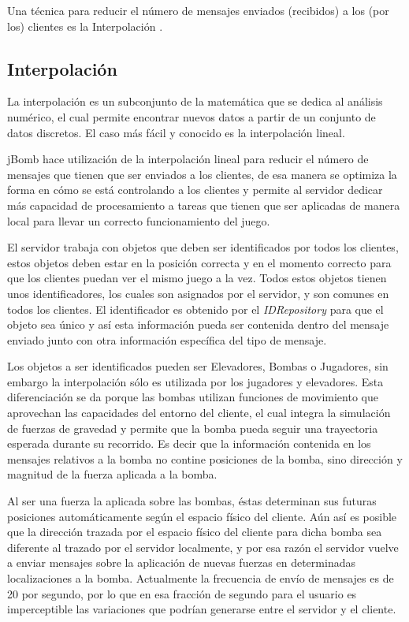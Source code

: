 \documentclass[a4paper,12pt,openany,oneside]{book}
\begin{document}
Una técnica para reducir el número de mensajes enviados (recibidos) a los (por los) clientes es la Interpolación \cite{VALVE1}.
\subsection{Interpolación} 
La interpolación es un subconjunto de la matemática que se dedica al análisis numérico, el cual permite encontrar nuevos datos a partir de un conjunto de datos discretos. El caso más fácil y conocido es la interpolación lineal.

jBomb hace utilización de la interpolación lineal para reducir el número de mensajes que tienen que ser enviados a los clientes, de esa manera se optimiza la forma en cómo se está controlando a los clientes y permite al servidor dedicar más capacidad de procesamiento a tareas que tienen que ser aplicadas de manera local para llevar un correcto funcionamiento del juego.

El servidor trabaja con objetos que deben ser identificados por todos los clientes, estos objetos deben estar en la posición correcta y en el momento correcto para que los clientes puedan ver el mismo juego a la vez. Todos estos objetos tienen unos identificadores, los cuales son asignados por el servidor, y son comunes en todos los clientes. El identificador es obtenido por el \textit{IDRepository} para que el objeto sea único y así esta información pueda ser contenida dentro del mensaje enviado junto con otra información específica del tipo de mensaje.

Los objetos a ser identificados pueden ser Elevadores, Bombas o Jugadores, sin embargo la interpolación sólo es utilizada por los jugadores y elevadores. Esta diferenciación se da porque las bombas utilizan funciones de movimiento que aprovechan las capacidades del entorno del cliente, el cual integra la simulación de fuerzas de gravedad y permite que la bomba pueda seguir una trayectoria esperada durante su recorrido. Es decir que la información contenida en los mensajes relativos a la bomba no contine posiciones de la bomba, sino dirección y magnitud de la fuerza aplicada a la bomba.

Al ser una fuerza la aplicada sobre las bombas, éstas determinan sus futuras posiciones automáticamente según el espacio físico del cliente. Aún así es posible que la dirección trazada por el espacio físico del cliente para dicha bomba sea diferente al trazado por el servidor localmente, y por esa razón el servidor vuelve a enviar mensajes sobre la aplicación de nuevas fuerzas en determinadas localizaciones a la bomba. Actualmente la frecuencia de envío de mensajes es de 20 por segundo, por lo que en esa fracción de segundo para el usuario es imperceptible las variaciones que podrían generarse entre el servidor y el cliente.
\end{document}
